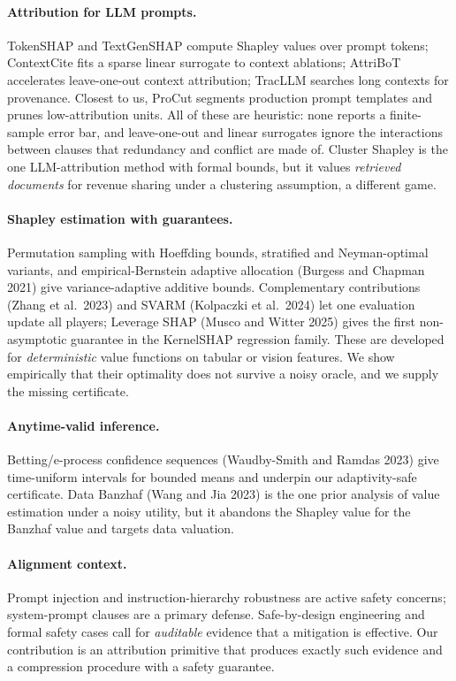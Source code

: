 \documentclass[10pt,twocolumn,letterpaper]{article}
\theoremstyle{plain}
\theoremstyle{definition}
\begin{document}
\paragraph{Attribution for LLM prompts.} TokenSHAP and TextGenSHAP compute
Shapley values over prompt tokens; ContextCite fits a sparse linear surrogate to
context ablations; AttriBoT accelerates leave-one-out context attribution;
TracLLM searches long contexts for provenance. Closest to us, ProCut segments
production prompt templates and prunes low-attribution units. All of these are
heuristic: none reports a finite-sample error bar, and leave-one-out and linear
surrogates ignore the interactions between clauses that redundancy and conflict
are made of. Cluster Shapley is the one LLM-attribution method with formal
bounds, but it values \emph{retrieved documents} for revenue sharing under a
clustering assumption, a different game.

\paragraph{Shapley estimation with guarantees.} Permutation sampling with
Hoeffding bounds, stratified and Neyman-optimal variants, and empirical-Bernstein
adaptive allocation (Burgess and Chapman 2021) give variance-adaptive additive
bounds. Complementary contributions (Zhang et al.\ 2023) and SVARM (Kolpaczki et
al.\ 2024) let one evaluation update all players; Leverage SHAP (Musco and Witter
2025) gives the first non-asymptotic guarantee in the KernelSHAP regression
family. These are developed for \emph{deterministic} value functions on tabular
or vision features. We show empirically that their optimality does not survive a
noisy oracle, and we supply the missing certificate.

\paragraph{Anytime-valid inference.} Betting/e-process confidence sequences
(Waudby-Smith and Ramdas 2023) give time-uniform intervals for bounded means and
underpin our adaptivity-safe certificate. Data Banzhaf (Wang and Jia 2023) is the
one prior analysis of value estimation under a noisy utility, but it abandons the
Shapley value for the Banzhaf value and targets data valuation.

\paragraph{Alignment context.} Prompt injection and instruction-hierarchy
robustness are active safety concerns; system-prompt clauses are a primary
defense. Safe-by-design engineering and formal safety cases call for
\emph{auditable} evidence that a mitigation is effective. Our contribution is an
attribution primitive that produces exactly such evidence and a compression
procedure with a safety guarantee.
\end{document}
